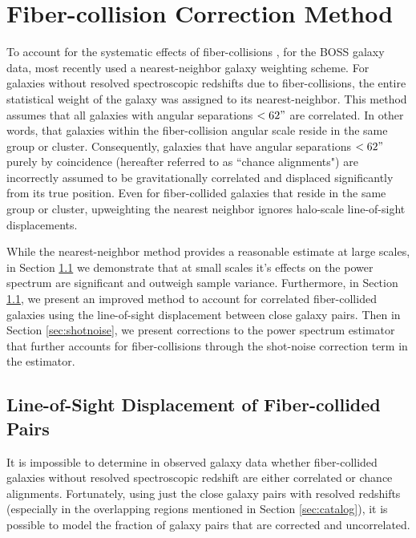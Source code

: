 \documentclass{emulateapj}
\begin{document}
\section{Fiber-collision Correction Method} \label{sec:fc_corr}
To account for the systematic effects of fiber-collisions \cite{Anderson:2012aa}, for the BOSS galaxy data, most recently used a nearest-neighbor galaxy weighting scheme. For galaxies without resolved spectroscopic redshifts due to fiber-collisions, the entire statistical weight of the galaxy was assigned to its nearest-neighbor. This method assumes that all galaxies with angular separations $< 62 "$ are correlated. In other words, that galaxies within the fiber-collision angular scale reside in the same group or cluster. Consequently, galaxies that have angular separations $< 62"$ purely by coincidence (hereafter referred to as ``chance alignments") are incorrectly assumed to be gravitationally correlated and displaced significantly from its true position. Even for fiber-collided galaxies that reside in the same group or cluster, upweighting the nearest neighbor ignores halo-scale line-of-sight displacements. 

While the nearest-neighbor method provides a reasonable estimate at large scales, in Section \ref{sec:dlos} we demonstrate that at small scales it's effects on the power spectrum are significant and outweigh sample variance. Furthermore, in Section \ref{sec:dlos}, we present an improved method to account for correlated fiber-collided galaxies using the line-of-sight displacement between close galaxy pairs. Then in Section \ref{sec:shotnoise}, we present corrections to the power spectrum estimator that further accounts for fiber-collisions through the shot-noise correction term in the estimator. 

\subsection{Line-of-Sight Displacement of Fiber-collided Pairs} \label{sec:dlos}
It is impossible to determine in observed galaxy data whether fiber-collided galaxies without resolved spectroscopic redshift are either correlated or chance alignments. Fortunately, using just the close galaxy pairs with resolved redshifts (especially in the overlapping regions mentioned in Section \ref{sec:catalog}), it is possible to model the fraction of galaxy pairs that are corrected and uncorrelated. 
\end{document}

